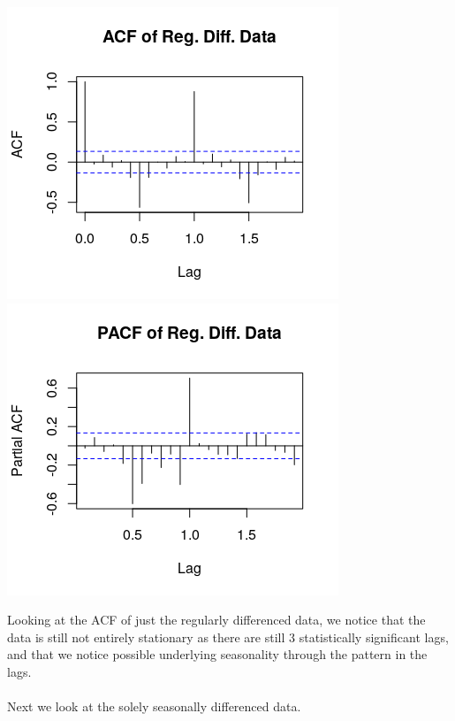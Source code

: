 \documentclass[11pt]{article}
\begin{document}
\begin{center}
\includegraphics[scale=.8]{1b1}
\includegraphics[scale=.8]{1b1a}
\end{center}
Looking at the ACF of just the regularly differenced data, we notice that the data is still not entirely stationary as there are still 3 statistically significant lags, and that we notice possible underlying seasonality through the pattern in the lags.
\\\\
Next we look at the solely seasonally differenced data. 
\end{document}
